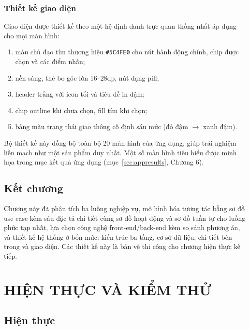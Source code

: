 \subsection{Thiết kế giao diện}
Giao diện được thiết kế theo một hệ định danh trực quan thống nhất áp dụng cho mọi màn hình:
\begin{enumerate}[label=(\roman*),leftmargin=2.2cm,itemsep=2pt]
 \item màu chủ đạo tím thương hiệu \texttt{\#5C4FE0} cho nút hành động chính, chip được chọn và các điểm nhấn;
 \item nền sáng, thẻ bo góc lớn 16--28dp, nút dạng pill;
 \item header trắng với icon tối và tiêu đề in đậm;
 \item chip outline khi chưa chọn, fill tím khi chọn;
 \item bảng màu trạng thái giao thông cố định sáu mức (đỏ đậm $\rightarrow$ xanh đậm).
\end{enumerate}
Bộ thiết kế này đồng bộ toàn bộ 20 màn hình của ứng dụng, giúp trải nghiệm liền mạch như một sản phẩm duy nhất. Một số màn hình tiêu biểu được minh họa trong mục kết quả ứng dụng (mục~\ref{sec:appresults}, Chương 6).

\section{Kết chương}
Chương này đã phân tích ba luồng nghiệp vụ, mô hình hóa tương tác bằng sơ đồ use case kèm sáu đặc tả chi tiết cùng sơ đồ hoạt động và sơ đồ tuần tự cho luồng phức tạp nhất, lựa chọn công nghệ front-end/back-end kèm so sánh phương án, và thiết kế hệ thống ở bốn mức: kiến trúc ba tầng, cơ sở dữ liệu, chi tiết bên trong và giao diện. Các thiết kế này là bản vẽ thi công cho chương hiện thực kế tiếp.

\chapter{HIỆN THỰC VÀ KIỂM THỬ}

\section{Hiện thực}

